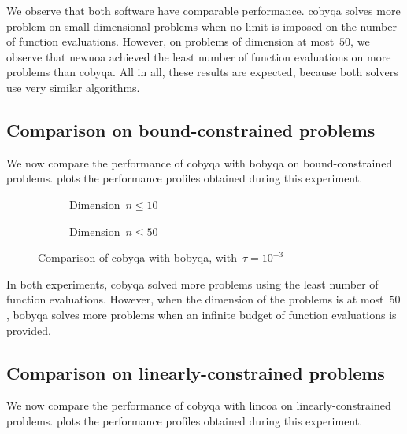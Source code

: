 We observe that both software have comparable performance.
\Gls{cobyqa} solves more problem on small dimensional problems when no limit is imposed on the number of function evaluations.
However, on problems of dimension at most~$50$, we observe that \gls{newuoa} achieved the least number of function evaluations on more problems than \gls{cobyqa}.
All in all, these results are expected, because both solvers use very similar algorithms.

\subsection{Comparison on bound-constrained problems}

We now compare the performance of \gls{cobyqa} with \gls{bobyqa} on bound-constrained problems.
 plots the performance profiles obtained during this experiment.

\begin{figure}[ht]
    \centering
    \begin{subfigure}[b]{0.49\textwidth}
        \centering
        \caption{Dimension~$n \le 10$}
    \end{subfigure}
    \hfill
    \begin{subfigure}[b]{0.49\textwidth}
        \centering
        \caption{Dimension~$n \le 50$}
    \end{subfigure}
    \caption{Comparison of \gls{cobyqa} with \gls{bobyqa}, with~$\tau = 10^{-3}$}
    \label{fig:cobyqa-bobyqa-bound-constrained}
\end{figure}

In both experiments, \gls{cobyqa} solved more problems using the least number of function evaluations.
However, when the dimension of the problems is at most~$50$, \gls{bobyqa} solves more problems when an infinite budget of function evaluations is provided.

\subsection{Comparison on linearly-constrained problems}
\label{subsec:comparison-cobyqa-lincoa}

We now compare the performance of \gls{cobyqa} with \gls{lincoa} on linearly-constrained problems.
 plots the performance profiles obtained during this experiment.

